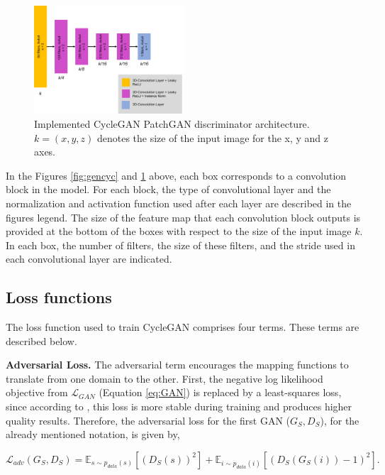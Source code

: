 \begin{figure}[!htb]
  \centering
  \includegraphics[width=0.50\textwidth]{Images/discriminator_cyclegan.jpg}
  \caption{Implemented CycleGAN PatchGAN discriminator architecture. $k=(x,y,z)$ denotes the size of the input image for the x, y and z axes.}
  \label{fig:disccyc}
\end{figure}

In the Figures \ref{fig:gencyc} and \ref{fig:disccyc} above, each box corresponds to a convolution block in the model. For each block, the type of convolutional layer and the normalization and activation function used after each layer are described in the figures legend. The size of the feature map that each convolution block outputs is provided at the bottom of the boxes with respect to the size of the input image $k$. In each box, the number of filters, the size of these filters, and the stride used in each convolutional layer are indicated.

\subsection*{Loss functions}

The loss function used to train CycleGAN comprises four terms. These terms are described below.

\textbf{Adversarial Loss.} The adversarial term encourages the mapping functions to translate from one domain to
the other. First, the negative log likelihood objective from $\mathcal{L}_{GAN}$  (Equation \ref{eq:GAN}) is replaced by a least-squares loss, since according to \cite{cycleGAN:original}, this loss is more stable during training and produces higher quality results. Therefore, the adversarial loss for the first \ac{GAN} ($G_{S}, D_S$), for the already mentioned notation, is given by,

\begin{equation}
    \mathcal{L}_{adv}(G_{S},D_S) = \mathbb{E}_{s \sim p_{data}(s)} [(D_S(s))^2] + \mathbb{E}_{i \sim p_{data}(i)} [(D_S(G_{S}(i))-1)^2].
\end{equation}


